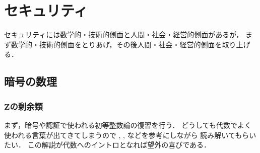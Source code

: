 %
%
%
%
%
%
%
%
%   
%
%

\chapter{セキュリティ}
セキュリティには数学的・技術的側面と人間・社会・経営的側面があるが，
まず数学的・技術的側面をとりあげ，その後人間・社会・経営的側面を取り上げる．

\section{暗号の数理}
\subsection{$\mathbf Z$の剰余類}
まず，暗号や認証で使われる初等整数論の復習を行う．
どうしても代数でよく使われる言葉が出てきてしまうので
\cite{Ho}, \cite{Ta}, \cite{Ko} などを参考にしながら
読み解いてもらいたい．
この解説が代数へのイントロとなれば望外の喜びである．

